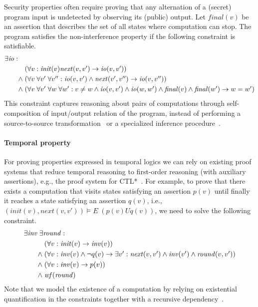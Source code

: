 \documentclass{new_tlp}
\newcommand{\limp}{\rightarrow}
\newcommand{\init}{\mathit{init}}
\newcommand{\next}{\mathit{next}}
\newcommand{\inv}{\mathit{inv}}
\newcommand{\round}{\mathit{round}}
\newcommand{\wf}{\mathit{wf}}
\newcommand{\final}{\mathit{final}}
\newcommand{\io}{\mathit{io}}
\begin{document}
Security properties often require proving that any alternation of
a (secret) program input is undetected by observing its (public)
output.
Let $\final(v)$ be an assertion that describes the set of all states
where computation can stop.
The program satisfies the non-interference property if the following
constraint is satisfiable.
\begin{equation*}
  \begin{array}[t]{@{}l@{}}
    \exists \io: \\[\jot]
    \qquad
    \begin{array}[t]{@{}l@{\;}l@{}}
      & (\forall v: \init(v) \next(v, v')\limp \io(v, v')) \\[\jot]
      \land & 
      (\forall v\; \forall v'\;\forall v'': \io(v, v') \land \next(v', v'') \limp \io(v, v'')) \\[\jot]
      \land & (\forall v\;\forall v'\;\forall w\;\forall w' : v\neq w \land \io(v, v') \land \io(w, w') \land \final(v) \land \final(w') \limp w=w') 
    \end{array}
  \end{array}
\end{equation*}
This constraint captures reasoning about pairs of computations through
self-composition of input/output relation of the program, instead of
performing a source-to-source transformation~\cite{SelfComp} or a
specialized inference procedure~\cite{Leak2009}.



\paragraph{Temporal property}

For proving properties expressed in temporal logics we can rely on
existing proof systems that reduce temporal reasoning to first-order
reasoning (with auxiliary assertions), e.g., the proof system for
CTL*~\cite{KestenTCS95}.
For example, to prove that there exists a computation that visits
states satisfying an assertion $p(v)$ until finally it reaches a state
satisfying an assertion $q(v)$, i.e., $(\init(v), \next(v, v'))
\models E\;(p(v) U q(v))$, we need to solve the following constraint.
\begin{equation*}
  \begin{array}[t]{@{}l@{}}
    \exists \inv\; \exists \round: \\[\jot]
    \qquad
    \begin{array}[t]{@{}l@{\;}l@{}}
      & (\forall v: \init(v) \limp \inv(v)) \\[\jot]
      \land & 
      (\forall v: \inv(v) \land \neg q(v)  \limp \exists v': \next(v,v') \land \inv(v') \land \round(v, v')) \\[\jot]
      \land & (\forall v: \inv(v) \limp p(v)) \\[\jot]
      \land & \wf(\round)
    \end{array}
  \end{array}
\end{equation*}
Note that we model the existence of a computation by relying on
existential quantification in the constraints together with a
recursive dependency~\cite{ehsf}. 
\end{document}
